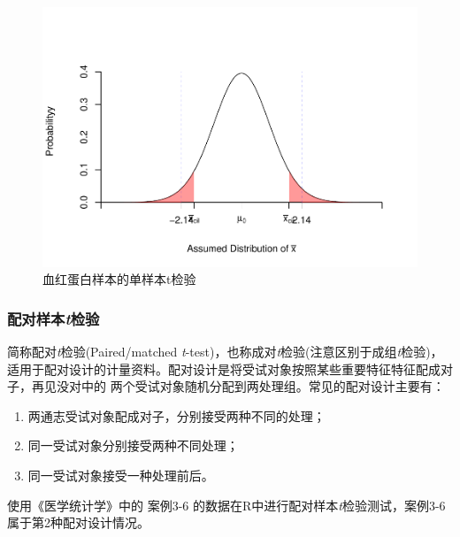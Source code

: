 \documentclass[
]{article}
\begin{document}
\begin{figure}

{\centering \includegraphics[width=0.49\linewidth,height=0.49\textheight]{figs/hometdist} 

}

\caption{血红蛋白样本的单样本t检验}\label{fig:hometdist}
\end{figure}

\hypertarget{ux914dux5bf9ux6837ux672ctux68c0ux9a8c}{%
\subsubsection{\texorpdfstring{配对样本\emph{t}检验}{配对样本t检验}}\label{ux914dux5bf9ux6837ux672ctux68c0ux9a8c}}

简称配对\emph{t}检验(Paired/matched \emph{t}-test)，也称成对\emph{t}检验(注意区别于成组\emph{t}检验)，适用于配对设计的计量资料。配对设计是将受试对象按照某些重要特征特征配成对子，再见没对中的
两个受试对象随机分配到两处理组。常见的配对设计主要有：

\begin{enumerate}
\def\labelenumi{\arabic{enumi}.}
\item
  两通志受试对象配成对子，分别接受两种不同的处理；
\item
  同一受试对象分别接受两种不同处理；
\item
  同一受试对象接受一种处理前后。
\end{enumerate}

使用《医学统计学》中的 案例3-6 的数据在R中进行配对样本\emph{t}检验测试，案例3-6属于第2种配对设计情况。
\end{document}
